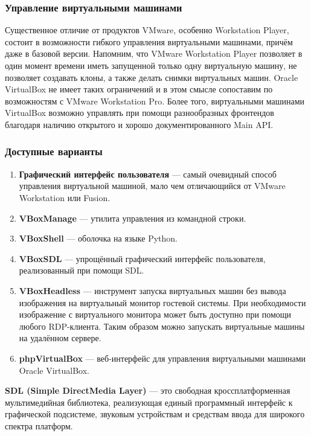 \documentclass[14pt, a4paper]{article}
\begin{document}
\subsubsection*{Управление виртуальными машинами} 

Существенное отличие от продуктов VMware, особенно Workstation Player, состоит в возможности
гибкого управления виртуальными машинами, причём даже в базовой версии. Напомним, что VMware
Workstation Player позволяет в один момент времени иметь запущенной только одну виртуальную
машину, не позволяет создавать клоны, а также делать снимки виртуальных машин. Oracle VirtualBox
не имеет таких ограничений и в этом смысле сопоставим по возможностям с VMware Workstation Pro.
Более того, виртуальными машинами VirtualBox возможно управлять при помощи разнообразных
фронтендов благодаря наличию открытого и хорошо документированного Main API.

\subsubsection*{Доступные варианты} 

\begin{enumerate}
    \item \textbf{Графический интерфейс пользователя} — самый очевидный способ управления
    виртуальной машиной, мало чем отличающийся от VMware Workstation или Fusion.
    \item \textbf{VBoxManage} — утилита управления из командной строки.
    \item \textbf{VBoxShell} — оболочка на языке Python.
    \item \textbf{VBoxSDL} — упрощённый графический интерфейс пользователя, реализованный при помощи
    SDL.
    \item \textbf{VBoxHeadless} — инструмент запуска виртуальных машин без вывода изображения на
    виртуальный монитор гостевой системы. При необходимости изображение с виртуального
    монитора может быть доступно при помощи любого RDP-клиента. Таким образом можно
    запускать виртуальные машины на удалённом сервере.
    \item \textbf{phpVirtualBox} — веб-интерфейс для управления виртуальными машинами Oracle VirtualBox.
\end{enumerate}

\textbf{SDL (Simple DirectMedia Layer)} — это свободная кроссплатформенная мультимедийная библиотека,
реализующая единый программный интерфейс к графической подсистеме, звуковым устройствам и
средствам ввода для широкого спектра платформ.\\
\end{document}
